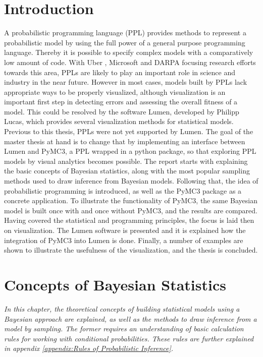 \documentclass{article}
\begin{document}
\section{Introduction}
A probabilistic programming language (PPL) provides methods to represent a probabilistic model by using the full power of a general purpose programming language. Thereby it is possible to specify complex models with a comparatively low amount of code. With Uber \cite{bingham2018pyro}, Microsoft \cite{gordon2014probabilistic} and DARPA \cite{Hardesty2015} focusing research efforts towards this area, PPLs are likely to play an important role in science and industry in the near future.
However in most cases, models built by PPLs lack appropriate ways to be properly visualized, although visualization is an important first step in detecting errors and assessing the overall fitness of a model. This could be resolved by the software Lumen, developed by Philipp Lucas, which provides several visualization methods for statistical models. Previous to this thesis, PPLs were not yet supported by Lumen. The goal of the master thesis at hand is to change that by implementing an interface between Lumen and PyMC3, a PPL wrapped in a python package, so that exploring PPL models by visual analytics becomes possible. The report starts with explaining the basic concepts of Bayesian statistics, along with the most popular sampling methods used to draw inference from Bayesian models. Following that, the idea of probabilistic programming is introduced, as well as the PyMC3 package as a concrete application. To illustrate the functionality of PyMC3, the same Bayesian model is built once with and once without PyMC3, and the results are compared. Having covered the statistical and programming principles, the focus is laid then on visualization. The Lumen software is presented and it is explained how the integration of PyMC3 into Lumen is done. Finally, a number of examples are shown to illustrate the usefulness of the visualization, and the thesis is concluded.
\section{Concepts of Bayesian Statistics}
\textit{In this chapter, the theoretical concepts of building statistical models using a Bayesian approach are explained, as well as the methods to draw inference from a model by sampling. The former requires an understanding of basic calculation rules for working with conditional probabilities. These rules are further explained in appendix \ref{appendix:Rules of Probabilistic Inference}.}
\end{document}
